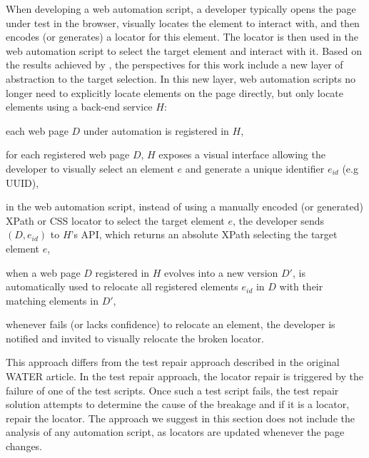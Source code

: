 When developing a web automation script, a developer typically opens the page under test in the browser, visually locates the element to interact with, and then encodes (or generates) a locator for this element.
The locator is then used in the web automation script to select the target element and interact with it.
% 
Based on the results achieved by \erratum{}, the perspectives for this work include a new layer of abstraction to the target selection.
In this new layer, web automation scripts no longer need to explicitly locate elements on the page directly, but only locate elements using a back-end service $H$:
\begin{compactenum}
    \item each web page $D$ under automation is registered in $H$,
    \item for each registered web page $D$, $H$ exposes a visual interface
    allowing the developer to visually select an element $e$ and generate a
    unique identifier $e_{id}$ (e.g UUID),
    \item in the web automation script, instead of using a manually encoded (or generated) XPath or CSS locator to select the target element $e$, the developer sends $(D, e_{id})$ to $H$'s API, which returns an absolute XPath selecting the target element $e$,
    \item when a web page $D$ registered in $H$ evolves into a new version $D'$, \erratum{} is automatically used to relocate all registered elements $e_{id}$ in $D$ with their matching elements in $D'$,
    \item whenever \erratum{} fails (or lacks confidence) to relocate an element, the developer is notified and invited to visually relocate the broken locator.
\end{compactenum}

This approach differs from the test repair approach described in the original WATER article. 
In the test repair approach, the locator repair is triggered by the failure of one of the test scripts.
Once such a test script fails, the test repair solution attempts to determine the cause of the breakage and if it is a locator, repair the locator.
The approach we suggest in this section does not include the analysis of any automation script, as locators are updated whenever the page changes.


